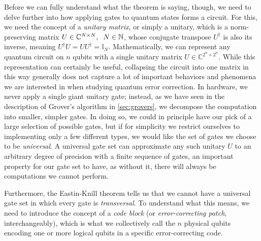Before we can fully understand what the theorem is saying, though, we need to delve further into how applying gates to quantum states forms a circuit. For this, we need the concept of a \emph{unitary matrix}, or simply a unitary, which is a norm-preserving matrix $U \in \mathbb{C}^{N \times N}, \hspace{0.2cm} N \in \mathbb{N}$, whose conjugate transpose $U^\dagger$ is also its inverse, meaning $U^\dagger U = UU^\dagger = \mathbb{I}_N$. Mathematically, we can represent any quantum circuit on $n$ qubits with a single unitary matrix $U \in \mathbb{C}^{2^n \times 2^n}$.
While this representation can certainly be useful, %
collapsing the circuit into one matrix in this way generally does not capture a lot of important behaviors and phenomena we are interested in when studying quantum error correction. In hardware, we never apply a single giant unitary gate; instead, as we have seen in the description of Grover's algorithm in \cref{sec:grovers}, we decompose the computation into smaller, simpler gates. In doing so, we could in principle have our pick of a large selection of possible gates, but if for simplicity we restrict ourselves to implementing only a few different types, we would like the set of gates we choose to be \emph{universal}. A universal gate set can approximate any such unitary $U$ to an arbitrary degree of precision with a finite sequence of gates, an important property for our gate set to have, as without it, there will always be computations we cannot perform.

Furthermore, the Eastin-Knill theorem tells us that we cannot have a universal gate set in which every gate is \emph{transversal}. To understand what this means, we need to introduce the concept of a \emph{code block} (or \emph{error-correcting patch}, interchangeably), which is what we collectively call the $n$ physical qubits encoding one or more logical qubits in a specific error-correcting code. 

\begin{center}
\end{center}

